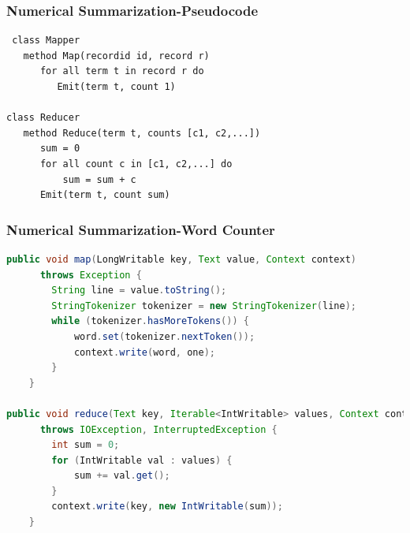 \documentclass[xcolor=dvipsnames,dvip,notes=show,table]{beamer}
\begin{document}


\begin{frame}[fragile]
  \frametitle{Numerical Summarization-Pseudocode}
\begin{verbatim}
 class Mapper
   method Map(recordid id, record r)
      for all term t in record r do
         Emit(term t, count 1)
 
class Reducer
   method Reduce(term t, counts [c1, c2,...])
      sum = 0
      for all count c in [c1, c2,...] do
          sum = sum + c
      Emit(term t, count sum)      
\end{verbatim}
\end{frame}    

\begin{frame}[fragile]
  \frametitle{Numerical Summarization-Word Counter}

\begin{lstlisting}[language=Java]
public void map(LongWritable key, Text value, Context context) 
      throws Exception {
        String line = value.toString();
        StringTokenizer tokenizer = new StringTokenizer(line);
        while (tokenizer.hasMoreTokens()) {
            word.set(tokenizer.nextToken());
            context.write(word, one);
        }
    }
    
public void reduce(Text key, Iterable<IntWritable> values, Context context) 
      throws IOException, InterruptedException {
        int sum = 0;
        for (IntWritable val : values) {
            sum += val.get();
        }
        context.write(key, new IntWritable(sum));
    }    
\end{lstlisting}

\end{frame}
\end{document}
